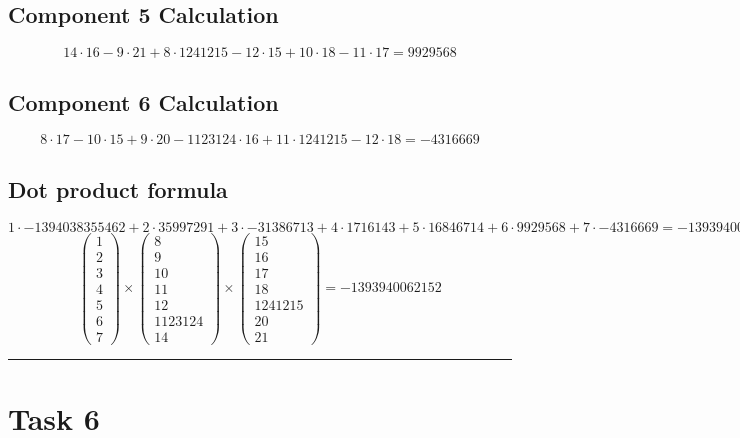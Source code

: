 \documentclass{article}
\begin{document}
\subsection*{ \vspace{1em} Component 5 Calculation}
\[
14 \cdot 16 - 9 \cdot 21 + 8 \cdot 1241215 - 12 \cdot 15 + 10 \cdot 18 - 11 \cdot 17 = 9929568
\]
\subsection*{ \vspace{1em} Component 6 Calculation}
\[
8 \cdot 17 - 10 \cdot 15 + 9 \cdot 20 - 1123124 \cdot 16 + 11 \cdot 1241215 - 12 \cdot 18 = -4316669
\]
\subsection*{ \vspace{1em} Dot product formula}
\[
1 \cdot -1394038355462 + 2 \cdot 35997291 + 3 \cdot -31386713 + 4 \cdot 1716143 + 5 \cdot 16846714 + 6 \cdot 9929568 + 7 \cdot -4316669 = -1393940062152
\]
\[
\begin{pmatrix}1 \\ 2 \\ 3 \\ 4 \\ 5 \\ 6 \\ 7\end{pmatrix} \times \begin{pmatrix}8 \\ 9 \\ 10 \\ 11 \\ 12 \\ 1123124 \\ 14\end{pmatrix} \times \begin{pmatrix}15 \\ 16 \\ 17 \\ 18 \\ 1241215 \\ 20 \\ 21\end{pmatrix} = -1393940062152
\]
\vspace{1em}
\hrule
\vspace{1em}
\section*{Task 6}
\end{document}
